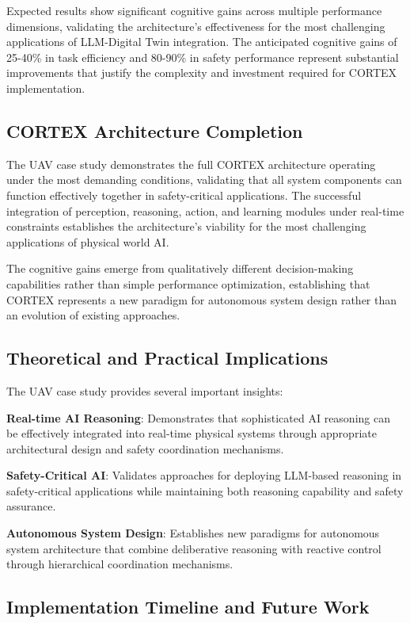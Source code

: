 Expected results show significant cognitive gains across multiple performance dimensions, validating the architecture's effectiveness for the most challenging applications of LLM-Digital Twin integration. The anticipated cognitive gains of 25-40\% in task efficiency and 80-90\% in safety performance represent substantial improvements that justify the complexity and investment required for CORTEX implementation.

\subsection{CORTEX Architecture Completion}

The UAV case study demonstrates the full CORTEX architecture operating under the most demanding conditions, validating that all system components can function effectively together in safety-critical applications. The successful integration of perception, reasoning, action, and learning modules under real-time constraints establishes the architecture's viability for the most challenging applications of physical world AI.

The cognitive gains emerge from qualitatively different decision-making capabilities rather than simple performance optimization, establishing that CORTEX represents a new paradigm for autonomous system design rather than an evolution of existing approaches.

\subsection{Theoretical and Practical Implications}

The UAV case study provides several important insights:

\textbf{Real-time AI Reasoning}: Demonstrates that sophisticated AI reasoning can be effectively integrated into real-time physical systems through appropriate architectural design and safety coordination mechanisms.

\textbf{Safety-Critical AI}: Validates approaches for deploying LLM-based reasoning in safety-critical applications while maintaining both reasoning capability and safety assurance.

\textbf{Autonomous System Design}: Establishes new paradigms for autonomous system architecture that combine deliberative reasoning with reactive control through hierarchical coordination mechanisms.

\subsection{Implementation Timeline and Future Work}

